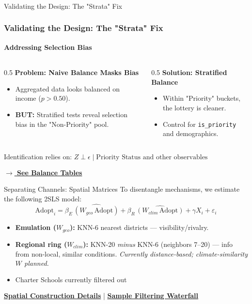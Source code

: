 \documentclass[10pt]{beamer}
\begin{document}
\begin{frame}[label=validating_design]{Validating the Design: The "Strata" Fix}
  \frametitle{Validating the Design: The "Strata" Fix}
  \framesubtitle{Addressing Selection Bias}

  \begin{columns}[T]
    \begin{column}{0.5\textwidth}
      \textbf{Problem: Naive Balance Masks Bias}
      \begin{itemize}
        \item Aggregated data looks balanced on income ($p>0.50$).
        \item \textbf{BUT:} Stratified tests reveal selection bias in the "Non-Priority" pool.
      \end{itemize}
    \end{column}
    \begin{column}{0.5\textwidth}
      \textbf{Solution: Stratified Balance}
      \begin{itemize}
        \item Within "Priority" buckets, the lottery is cleaner.
        \item Control for \texttt{is\_priority} and demographics.
      \end{itemize}
    \end{column}
  \end{columns}
  
  \vspace{1em}
  \centering
  \alert{Identification relies on: $Z \perp \epsilon \mid \text{Priority Status and other observables}$}
  
  \vspace{1em}
  \hyperlink{backup_balance}{\textbf{\color{mLightBrown} $\rightarrow$ See Balance Tables}}
\end{frame}

\begin{frame}{Separating Channels: Spatial Matrices}
To disentangle mechanisms, we estimate the following 2SLS model:
\small
\[
\text{Adopt}_i
= \beta_E\,\widehat{(W_{geo}\, \text{Adopt})}
+ \beta_R\,\widehat{(W_{clim}\, \text{Adopt})}
+ \gamma X_i + \varepsilon_i
\]

\begin{itemize}\setlength\itemsep{0.25em}
  \item \textbf{Emulation ($W_{geo}$):} KNN-6 nearest districts — visibility/rivalry.
  \item \textbf{Regional ring ($W_{clim}$):} KNN-20 \emph{minus} KNN-6 (neighbors 7–20) — info from non-local, similar conditions. \emph{Currently distance-based; climate-similarity $W$ planned.}
  \item Charter Schools currently filtered out
\end{itemize}

\medskip
\hyperlink{backup_spatial}{\textbf{\color{mLightBrown}Spatial Construction Details}}
\hspace{0.8em}| \hspace{0.8em}
\hyperlink{backup_lea_waterfall}{\textbf{\color{mLightBrown}Sample Filtering Waterfall}}
\end{frame}
\end{document}
